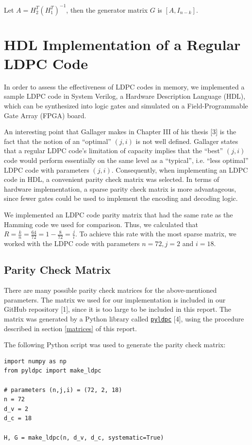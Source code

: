 \documentclass[conference]{IEEEtran}
\begin{document}
    Let $A = H_2^T(H_1^T)^{-1}$, then the generator matrix $G$ is $[A, I_{n-k}]$.

\section{HDL Implementation of a Regular LDPC Code}
In order to assess the effectiveness of LDPC codes in memory, we implemented a sample LDPC code in System Verilog, a Hardware Description Language (HDL), which can be synthesized into logic gates and simulated on a Field-Programmable Gate Array (FPGA) board.

An interesting point that Gallager makes in Chapter III of his thesis [3] is the fact that the notion of an ``optimal'' $(j,i)$ is not well defined.
Gallager states that a regular LDPC code's limitation of capacity implies that the ``best'' $(j,i)$ code would perform essentially on the same level as a ``typical'', i.e. ``less optimal'' LDPC code with parameters $(j,i)$.
Consequently, when implementing an LDPC code in HDL, a convenient parity check matrix was selected.
In terms of hardware implementation, a sparse parity check matrix is more advantageous, since fewer gates could be used to implement the encoding and decoding logic.

We implemented an LDPC code parity matrix that had the same rate as 
the Hamming code we used for comparison.
Thus, we calculated that $R=\frac{k}{n}=\frac{64}{72}=1-\frac{8}{72} = \frac{j}{i}$.
To achieve this rate with the most sparse matrix, we worked with the LDPC code with parameters $n=72, j=2$ and $i=18$.

\subsection{Parity Check Matrix}
There are many possible parity check matrices for the above-mentioned parameters. The matrix we used for our implementation is included in our GitHub repository [1], since it is too large to be included in this report. The matrix was generated by a Python library called \href{https://hichamjanati.github.io/pyldpc/}{\texttt{pyldpc}} [4], using the procedure described in section \ref{matrices} of this report.

The following Python script was used to generate the parity check matrix:
\begin{verbatim}
import numpy as np
from pyldpc import make_ldpc

# parameters (n,j,i) = (72, 2, 18)
n = 72
d_v = 2
d_c = 18

H, G = make_ldpc(n, d_v, d_c, systematic=True)
\end{verbatim}
\end{document}

